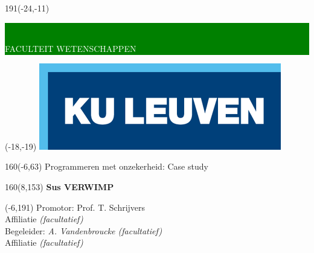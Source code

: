 \documentclass[12pt,a4paper,oneside]{book}
\begin{document}
\thispagestyle{empty}
\newcommand{\form}[1]{\scalebox{1.087}{\boldmath{#1}}}
\sffamily
%
\begin{textblock}{191}(-24,-11)
\colorbox{green}{\hspace{123mm}\ \parbox[c][18truemm]{68mm}{\textcolor{white}{FACULTEIT WETENSCHAPPEN}}}
\end{textblock}
%
\begin{textblock}{70}(-18,-19)
\textblockcolour{}
\includegraphics*[height=19.8truemm]{LogoKULeuven}
\end{textblock}
%
\begin{textblock}{160}(-6,63)
\textblockcolour{}
\vspace{-\parskip}
\flushleft
\fontsize{40}{42}\selectfont \textcolor{bluetitle}{Programmeren met onzekerheid: Case study}\\[1.5mm]
\end{textblock}
%
\begin{textblock}{160}(8,153)
\textblockcolour{}
\vspace{-\parskip}
\flushright
\fontsize{14}{16}\selectfont \textbf{Sus VERWIMP}
\end{textblock}
%
\begin{textblock}{70}(-6,191)
\textblockcolour{}
\vspace{-\parskip}
\flushleft
Promotor: Prof. T. Schrijvers\\[-2pt]
\textcolor{blueaff}{Affiliatie \textsl{(facultatief)}}\\[5pt]
Begeleider: \textsl{A. Vandenbroucke (facultatief)}\\[-2pt]
\textcolor{blueaff}{Affiliatie \textsl{(facultatief)}}\\
\end{textblock}
\end{document}
